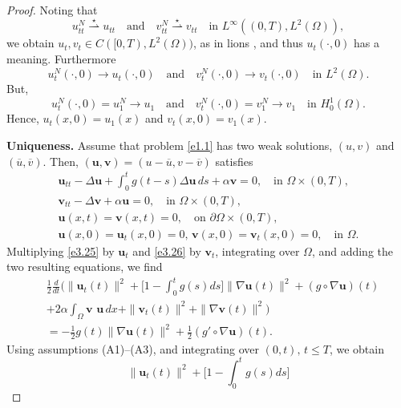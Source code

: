 \documentclass[11pt]{article}
\numberwithin{equation}{section}
\begin{document}
\begin{proof}
Noting that
\[
 u_{tt}^{N} \overset{\star}{\rightharpoonup} u_{tt} \quad \text{and} \quad
 v_{tt}^{N} \overset{\star}{\rightharpoonup} v_{tt} \quad \text{in }
 L^\infty((0,T), L^2(\Omega)),
\]
we obtain $ u_t , v_{t} \in C([0, T), L^2(\Omega))$, as in lions \cite{Lions},
and thus \( u_t(\cdot, 0) \) has a meaning. Furthermore
\[
u^N_t(\cdot, 0) \to u_t(\cdot, 0) \quad \text{and} \quad
v^N_t(\cdot, 0) \to v_t(\cdot, 0) \quad\text{in } L^2(\Omega).
\]
But,
\[ u^N_t(\cdot, 0) = u^N_1 \to u_1 \quad \text{and} \quad
 v^N_t(\cdot, 0) = v^N_1 \to v_1 \quad \text{in } H^1_0(\Omega).
\]
Hence,
$u_t(x, 0) = u_1(x)$ and $v_t(x, 0) = v_1(x)$.
\smallskip

\noindent\textbf{Uniqueness.}
Assume that problem \eqref{e1.1} has two weak solutions, \( (u, v) \) and
\( (\overline{u},\overline{v}) \). Then,
\( (\mathbf{u}, \mathbf{v}) = (u - \overline{u}, v - \overline{v}) \) satisfies
\begin{gather}
 \mathbf{u}_{tt} - \Delta \mathbf{u} + \int_0^t g(t-s) \Delta \mathbf{u} \, ds
 + \alpha \mathbf{v} = 0, \quad \text{in } \Omega \times (0, T), \label{e3.25}\\
 \mathbf{v}_{tt} - \Delta \mathbf{v} + \alpha \mathbf{u} = 0, \quad
 \text{in } \Omega \times (0, T), \label{e3.26} \\
 \mathbf{u}(x,t) = \mathbf{v}(x,t) = 0, \quad \text{on } \partial\Omega \times (0, T),
 \label{e3.27}\\
 \mathbf{u}(x,0) = \mathbf{u}_t(x,0) =0,\, \mathbf{v}(x,0)=\mathbf{v}_t(x,0) = 0,
 \quad \text{in } \Omega. \label{e3.28}
\end{gather}
Multiplying \eqref{e3.25} by $\mathbf{u}_{t}$ and \eqref{e3.26} by $\mathbf{v}_{t}$,
integrating over $\Omega$, and adding the two resulting equations, we find
\begin{equation}
\begin{aligned}
&\frac{1}{2}\frac{d}{dt} \Big( \| \mathbf{u}_{t}(t) \| ^2
 + \Big[ 1-\int_0^t g(s) ds \Big] \| \nabla \mathbf{u} (t)\|^2
 +(g\circ \nabla \mathbf{u})(t) \\
&+2 \alpha \int_\Omega \mathbf{v}\textbf{ u}\,dx
 +\| \mathbf{v}_{t}(t) \|^2 + \| \nabla \mathbf{v} (t)\|^2 \Big)\\
& = -\frac{1}{2} g(t)\parallel \nabla \mathbf{u}(t) \parallel^2
 + \frac{1}{2}( g'\circ\nabla \mathbf{u}) (t).
\end{aligned} \label{e3.29}
\end{equation}
Using assumptions (A1)--(A3), and integrating over $(0, t),\, t\leq T$, we obtain
\[
 \| \mathbf{u}_{t}(t) \| ^2+ \Big[ 1-\int_0^t g(s) ds \Big]
\]
\end{proof}
\end{document}
